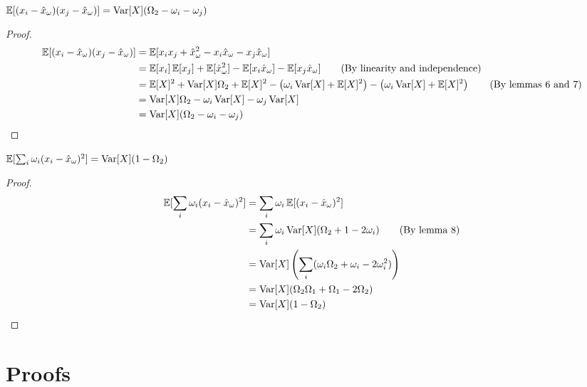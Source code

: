 \documentclass[11pt]{hw-template}
\begin{document}
    \begin{lemma}
      $\operatorname{\mathbb{E}}[(x_i - \hat{x}_\omega)(x_j - \hat{x}_\omega)] = \operatorname{Var}[X](\Omega_2 - \omega_i - \omega_j)$
    \end{lemma}
    \begin{proof}
      \begin{align*}
        \operatorname{\mathbb{E}}[(x_i - \hat{x}_\omega)(x_j - \hat{x}_\omega)]
        &= \operatorname{\mathbb{E}}[x_i x_j + \hat{x}_\omega^2 - x_i\hat{x}_\omega - x_j\hat{x}_\omega] \\
        &= \operatorname{\mathbb{E}}[x_i] \operatorname{\mathbb{E}}[x_j] + \operatorname{\mathbb{E}}[\hat{x}_\omega^2] - \operatorname{\mathbb{E}}[x_i\hat{x}_\omega] - \operatorname{\mathbb{E}}[x_j\hat{x}_\omega] \tag{By linearity and independence}\\
        &= \operatorname{\mathbb{E}}[X]^2 + \operatorname{Var}[X]\Omega_2 + \operatorname{\mathbb{E}}[X]^2 - \left(\omega_i \operatorname{Var}[X] + \operatorname{\mathbb{E}}[X]^2\right)- \left(\omega_i \operatorname{Var}[X] + \operatorname{\mathbb{E}}[X]^2\right) \tag{By lemmas 6 and 7}\\
        &= \operatorname{Var}[X]\Omega_2 - \omega_i \operatorname{Var}[X] - \omega_j \operatorname{Var}[X]\\
        &= \operatorname{Var}[X](\Omega_2 - \omega_i - \omega_j)
      \end{align*}
    \end{proof}
    
    \begin{lemma}
      $\operatorname{\mathbb{E}}[\sum_i\omega_i(x_i - \hat{x}_\omega)^2] = \operatorname{Var}[X] (1 - \Omega_2)$
    \end{lemma}
    \begin{proof}
      \begin{align*}
        \operatorname{\mathbb{E}}[\sum_i \omega_i(x_i - \hat{x}_\omega)^2]
        &= \sum_i \omega_i\operatorname{\mathbb{E}}[(x_i - \hat{x}_\omega)^2]\\
        &= \sum_i \omega_i\operatorname{Var}[X] (\Omega_2 + 1 - 2\omega_i) \tag{By lemma 8} \\
        &= \operatorname{Var}[X] \left(\sum_i (\omega_i\Omega_2 + \omega_i - 2\omega_i^2)\right) \\
        &= \operatorname{Var}[X] (\Omega_2\Omega_1 + \Omega_1 - 2\Omega_2) \\
        &= \operatorname{Var}[X] (1 - \Omega_2) \\
      \end{align*}
    \end{proof}
\section*{Proofs}
\end{document}
